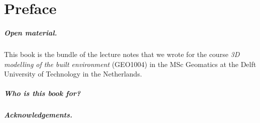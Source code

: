 


\chapter*{Preface}





\paragraph*{Open material.}
This book is the bundle of the lecture notes that we wrote for the course \emph{3D modelling of the built environment} (GEO1004) in the MSc Geomatics at the Delft University of Technology in the Netherlands.



\paragraph*{Who is this book for?}



\paragraph*{Acknowledgements.}






